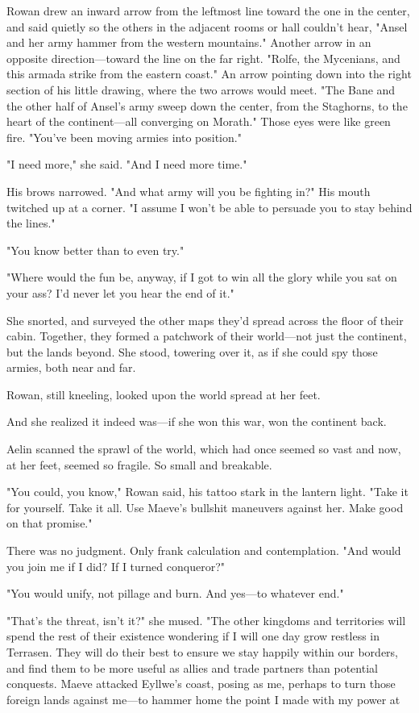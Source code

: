 Rowan drew an inward arrow from the leftmost line toward the one in the center, and said quietly so the others in the adjacent rooms or hall couldn't hear, "Ansel and her army hammer from the western mountains." Another arrow in an opposite direction---toward the line on the far right. "Rolfe, the Mycenians, and this armada strike from the eastern coast." An arrow pointing down into the right section of his little drawing, where the two arrows would meet. "The Bane and the other half of Ansel's army sweep down the center, from the Staghorns, to the heart of the continent---all converging on Morath." Those eyes were like green fire. "You've been moving armies into position."

"I need more," she said. "And I need more time."

His brows narrowed. "And what army will you be fighting in?" His mouth twitched up at a corner. "I assume I won't be able to persuade you to stay behind the lines."

"You know better than to even try."

"Where would the fun be, anyway, if I got to win all the glory while you sat on your ass? I'd never let you hear the end of it."

She snorted, and surveyed the other maps they'd spread across the floor of their cabin. Together, they formed a patchwork of their world---not just the continent, but the lands beyond. She stood, towering over it, as if she could spy those armies, both near and far.

Rowan, still kneeling, looked upon the world spread at her feet.

And she realized it indeed was---if she won this war, won the continent back.

Aelin scanned the sprawl of the world, which had once seemed so vast and now, at her feet, seemed so  fragile. So small and breakable.

"You could, you know," Rowan said, his tattoo stark in the lantern light. "Take it for yourself. Take it all. Use Maeve's bullshit maneuvers against her. Make good on that promise."

There was no judgment. Only frank calculation and contemplation. "And would you join me if I did? If I turned conqueror?"

"You would unify, not pillage and burn. And yes---to whatever end."

"That's the threat, isn't it?" she mused. "The other kingdoms and territories will spend the rest of their existence wondering if I will one day grow restless in Terrasen. They will do their best to ensure we stay happily within our borders, and find them to be more useful as allies and trade partners than potential conquests. Maeve attacked Eyllwe's coast, posing as me, perhaps to turn those foreign lands against me---to hammer home the point I made with my power at


